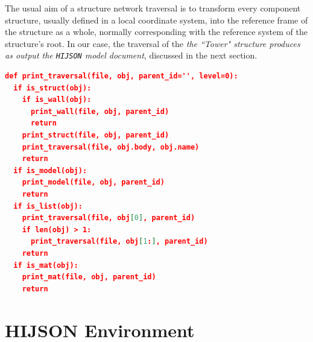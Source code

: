 \documentclass[]{egpubl}
\begin{document}
The usual aim of a structure network traversal is to transform every component structure, usually defined in a local coordinate system, into the reference frame of the structure as a whole, normally corresponding with the reference system of the structure's root. 
In our case, the traversal of the
\emph{the ``Tower" structure produces as output the \texttt{HIJSON} model document}, discussed in the next section. 

\begin{lstlisting}[language=json, label={lst:feature-collection-example}, captionpos=b, basicstyle=\ttfamily\scriptsize, caption=Algorithm producing a HIJSON file from an \texttt{obj} value.]
def print_traversal(file, obj, parent_id='', level=0): 
  if is_struct(obj):
    if is_wall(obj):
      print_wall(file, obj, parent_id)
      return
    print_struct(file, obj, parent_id)
    print_traversal(file, obj.body, obj.name)
    return
  if is_model(obj):
    print_model(file, obj, parent_id)
    return
  if is_list(obj):
    print_traversal(file, obj[0], parent_id)
    if len(obj) > 1:
      print_traversal(file, obj[1:], parent_id)
    return
  if is_mat(obj):
    print_mat(file, obj, parent_id)
    return
\end{lstlisting}

\section{HIJSON Environment}
\end{document}
